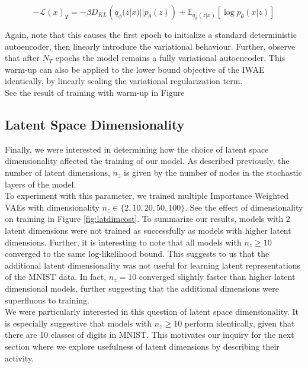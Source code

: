 \documentclass{article} %
\renewcommand{\L}{\mathcal{L}}
\begin{document}
\begin{equation}
    -\L(x)_T=-\beta D_{KL}\left(q_\phi(z|x)||p_\theta(z)\right)+\mathbb{E}_{q_\phi(z|x)}\left[\log{p_\theta(x|z)}\right]
\end{equation}

Again, note that this causes the first epoch to initialize a standard deterministic autoencoder, then linearly introduce the variational behaviour. Further, observe that after $N_T$ epochs the model remains a fully variational autoencoder. This warm-up can also be applied to the lower bound objective of the IWAE identically, by linearly scaling the variational regularization term.\\
See the result of training with warm-up in Figure %

\subsection{Latent Space Dimensionality}
%
Finally, we were interested in determining how the choice of latent space dimensionality affected the training of our model. As described previously, the number of latent dimensions, $n_z$ is given by the number of nodes in the stochastic layers of the model. \\
To experiment with this parameter, we trained multiple Importance Weighted VAEs with dimensionality ${n_z \in \{2,10,20,50,100\}}$. See the effect of dimensionality on training in Figure \ref{fig:latdimcost}. To summarize our results, models with 2 latent dimensions were not trained as successfully as models with higher latent dimensions. Further, it is interesting to note that all models with $n_z\geq10$ converged to the same log-likelihood bound. This suggests to us that the additional latent dimensionality was not useful for learning latent representations of the MNIST data. In fact, $n_z=10$ converged slightly faster than higher latent dimensional models, further suggesting that the additional dimensions were superfluous to training.\\
We were particularly interested in this question of latent space dimensionality. It is especially suggestive that models with $n_z\geq10$ perform identically, given that there are 10 classes of digits in MNIST. This motivates our inquiry for the next section where we explore usefulness of latent dimensions by describing their activity. 
\end{document}
